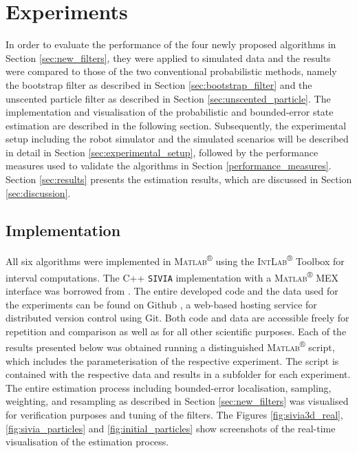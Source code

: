 \chapter{Experiments}\label{ch:experiments}

In order to evaluate the performance of the four newly proposed algorithms in Section \ref{sec:new_filters}, they were applied to simulated data and the results were compared to those of the two conventional probabilistic methods, namely the bootstrap filter as described in Section \ref{sec:bootstrap_filter} and the unscented particle filter as described in Section \ref{sec:unscented_particle}. The implementation and visualisation of the probabilistic and bounded-error state estimation are described in the following section. Subsequently, the experimental setup including the robot simulator and the simulated scenarios will be described in detail in Section \ref{sec:experimental_setup}, followed by the performance measures used to validate the algorithms in Section \ref{performance_measures}. Section \ref{sec:results} presents the estimation results, which are discussed in Section \ref{sec:discussion}.

\section{Implementation}\label{sec: implementation}

All six algorithms were implemented in \textsc{Matlab}\textsuperscript{®} using the \textsc{IntLab}\textsuperscript{®} Toolbox \cite{intlab} for interval computations.  The C++ \texttt{SIVIA} implementation with a \textsc{Matlab}\textsuperscript{®} MEX \cite{matlabMEX} interface was borrowed from \cite{garajova2016solving}. The entire developed code and the data used for the experiments can be found on Github \cite{codeGithub}, a web-based hosting service for distributed version control using Git. Both code and data are accessible freely for repetition and comparison as well as for all other scientific purposes. Each of the results presented below was obtained running a distinguished \textsc{Matlab}\textsuperscript{®} script, which includes the parameterisation of the respective experiment. The script is contained with the respective data and results in a subfolder for each experiment. The entire estimation process including bounded-error localisation, sampling, weighting, and resampling as described in Section \ref{sec:new_filters} was visualised for verification purposes and tuning of the filters. The Figures \ref{fig:sivia3d_real}, \ref{fig:sivia_particles} and \ref{fig:initial_particles} show screenshots of the real-time visualisation of the estimation process.


